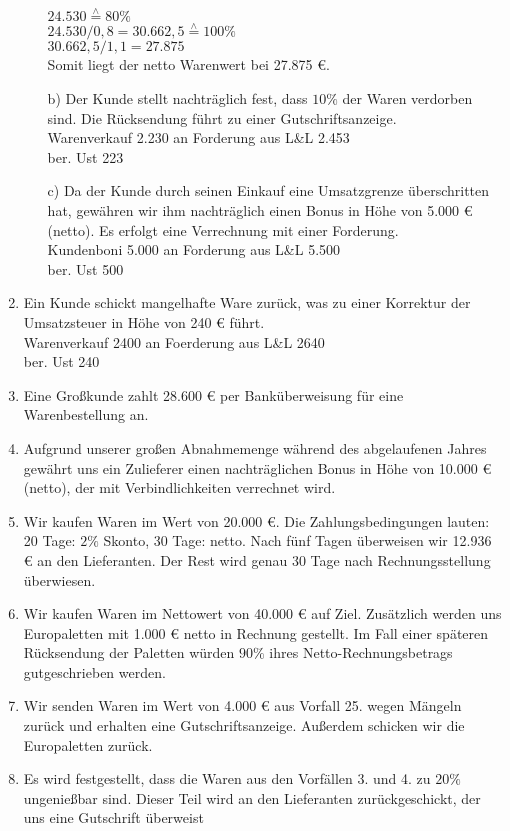 \documentclass[paper=a4, fontsize=11pt]{scrartcl}
\numberwithin{equation}{section}
\numberwithin{figure}{section}
\numberwithin{table}{section}
\begin{document}
\begin{enumerate}
\begin{itemize}
$24.530 \overset{\wedge}{=} 80 \%$ \\
$24.530/0,8 = 30.662,5 \overset{\wedge}{=} 100 \%$ \\
$30.662,5/1,1 = 27.875$ \\
Somit liegt der netto Warenwert bei 27.875 €.
\item[b)] Der Kunde stellt nachträglich fest, dass $10 \%$ der Waren verdorben sind. Die Rücksendung führt zu einer Gutschriftsanzeige. \\

Warenverkauf 2.230 an Forderung aus L\&L 2.453 \\
ber. Ust 223
\item[c)] Da der Kunde durch seinen Einkauf eine Umsatzgrenze überschritten hat, gewähren wir ihm nachträglich einen Bonus in Höhe von 5.000 € (netto). Es erfolgt eine Verrechnung mit einer Forderung.  \\

Kundenboni 5.000 an Forderung aus L\&L 5.500 \\
ber. Ust 500
\end{itemize}
\item Ein Kunde schickt mangelhafte Ware zurück, was zu einer Korrektur der Umsatzsteuer in Höhe von 240 € führt.  \\
Warenverkauf 2400 an Foerderung aus L\&L 2640 \\
ber. Ust 240
\item Eine Großkunde zahlt 28.600 € per Banküberweisung für eine Warenbestellung an. 
\item Aufgrund unserer großen Abnahmemenge während des abgelaufenen Jahres gewährt uns ein Zulieferer einen nachträglichen Bonus in Höhe von 10.000 € (netto), der mit Verbindlichkeiten verrechnet wird. 
\item Wir kaufen Waren im Wert von 20.000 €. Die Zahlungsbedingungen lauten: 20 Tage: $2 \%$ Skonto, 30 Tage: netto. Nach fünf Tagen überweisen wir 12.936 € an den Lieferanten. Der Rest wird genau 30 Tage nach Rechnungsstellung überwiesen. 
\item Wir kaufen Waren im Nettowert von 40.000 € auf Ziel. Zusätzlich werden uns Europaletten mit 1.000 € netto in Rechnung gestellt. Im Fall einer späteren Rücksendung der Paletten würden $90 \%$ ihres Netto-Rechnungsbetrags gutgeschrieben werden. 
\item Wir senden Waren im Wert von 4.000 € aus Vorfall 25. wegen Mängeln zurück und erhalten eine Gutschriftsanzeige. Außerdem schicken wir die Europaletten zurück. 
\item Es wird festgestellt, dass die Waren aus den Vorfällen 3. und 4. zu $20 \%$ ungenießbar sind. Dieser Teil wird an den Lieferanten zurückgeschickt, der uns eine Gutschrift überweist
\end{enumerate}
\end{document}
